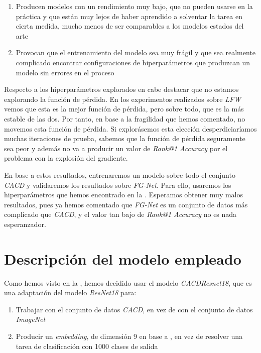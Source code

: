\begin{enumerate}
    \item Producen modelos con un rendimiento muy bajo, que no pueden usarse en la práctica y que están muy lejos de haber aprendido a solventar la tarea en cierta medida, mucho menos de ser comparables a los modelos estados del arte
    \item Provocan que el entrenamiento del modelo sea muy frágil y que sea realmente complicado encontrar configuraciones de hiperparámetros que produzcan un modelo sin errores en el proceso
\end{enumerate}

Respecto a los hiperparámetros explorados en  cabe destacar que no estamos explorando la función de pérdida. En los experimentos realizados sobre \textit{LFW} vemos que esta es la mejor función de pérdida, pero sobre todo, que es la más estable de las dos. Por tanto, en base a la fragilidad que hemos comentado, no movemos esta función de pérdida. Si explorásemos esta elección desperdiciaríamos muchas iteraciones de prueba, sabemos que la función de pérdida seguramente sea peor y además no va a producir un valor de \textit{Rank@1 Accuracy} por el problema con la explosión del gradiente.

En base a estos resultados, entrenaremos un modelo sobre todo el conjunto \textit{CACD} y validaremos los resultados sobre \textit{FG-Net}. Para ello, usaremos los hiperparámetros que hemos encontrado en la . Esperamos obtener muy malos resultados, pues ya hemos comentado que \textit{FG-Net} es un conjunto de datos más complicado que \textit{CACD}, y el valor tan bajo de \textit{Rank@1 Accuracy} no es nada esperanzador.

\section{Descripción del modelo empleado} \label{isec:explicacion_modelo}

Como hemos visto en la , hemos decidido usar el modelo \textit{CACDResnet18}, que es una adaptación del modelo \textit{ResNet18} para:

\begin{enumerate}
    \item Trabajar con el conjunto de datos \textit{CACD}, en vez de con el conjunto de datos \textit{ImageNet}
    \item Producir un \textit{embedding}, de dimensión 9 en base a , en vez de resolver una tarea de clasificación con 1000 clases de salida
\end{enumerate}


